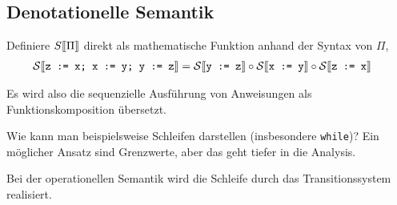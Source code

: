 \subsection{Denotationelle Semantik}

Definiere $S\mathrm{[}\kern-.14em\mathrm{[}\Pi\mathrm{]}\kern-.14em\mathrm{]}$ direkt als mathematische Funktion anhand der Syntax von $\Pi$, \zb{}
\begin{align*}
    \mathcal{S}\mathrm{[}\kern-.14em\mathrm{[}\texttt{z := x; x := y; y := z}\mathrm{]}\kern-.14em\mathrm{]} & = \mathcal{S}\mathrm{[}\kern-.14em\mathrm{[}\texttt{y := z}\mathrm{]}\kern-.14em\mathrm{]} \circ \mathcal{S}\mathrm{[}\kern-.14em\mathrm{[}\texttt{x := y}\mathrm{]}\kern-.14em\mathrm{]} \circ \mathcal{S}\mathrm{[}\kern-.14em\mathrm{[}\texttt{z := x}\mathrm{]}\kern-.14em\mathrm{]}
\end{align*}

Es wird also \zb{} die sequenzielle Ausführung von Anweisungen als Funktionskomposition übersetzt.

\begin{remark}[Problem]
    Wie kann man beispielsweise Schleifen darstellen (insbesondere \texttt{while})? Ein möglicher Ansatz sind Grenzwerte, aber das geht tiefer in die Analysis.

    Bei der operationellen Semantik wird die Schleife durch das Transitionssystem realisiert.
\end{remark}